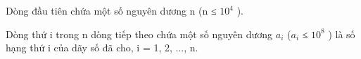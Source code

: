 Dòng đầu tiên chứa một số nguyên dương n (n ≤ $10^{4}$ ).

Dòng thứ i trong n dòng tiếp theo chứa một số nguyên dương $a_{i}$ ($a_{i}$ ≤ $10^{8}$ ) là số hạng thứ i của dãy số đã cho, i = 1, 2, ..., n.